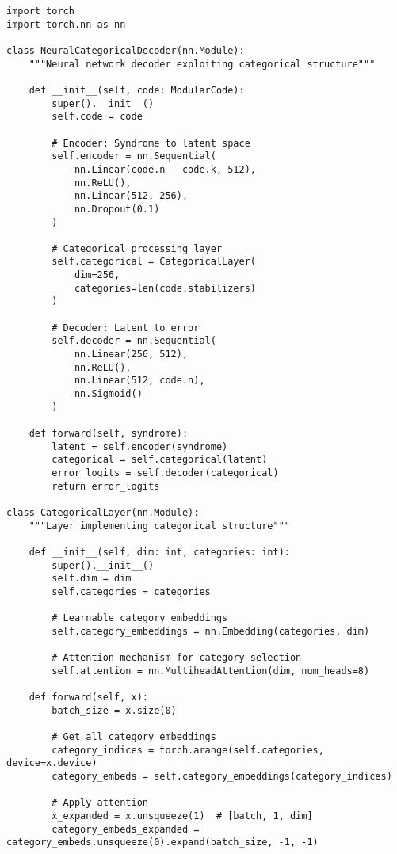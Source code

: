 \documentclass[12pt,a4paper]{article}
\begin{document}
\begin{lstlisting}[style=python,caption=Neural categorical decoder implementation]
import torch
import torch.nn as nn

class NeuralCategoricalDecoder(nn.Module):
    """Neural network decoder exploiting categorical structure"""
    
    def __init__(self, code: ModularCode):
        super().__init__()
        self.code = code
        
        # Encoder: Syndrome to latent space
        self.encoder = nn.Sequential(
            nn.Linear(code.n - code.k, 512),
            nn.ReLU(),
            nn.Linear(512, 256),
            nn.Dropout(0.1)
        )
        
        # Categorical processing layer
        self.categorical = CategoricalLayer(
            dim=256,
            categories=len(code.stabilizers)
        )
        
        # Decoder: Latent to error
        self.decoder = nn.Sequential(
            nn.Linear(256, 512),
            nn.ReLU(),
            nn.Linear(512, code.n),
            nn.Sigmoid()
        )
    
    def forward(self, syndrome):
        latent = self.encoder(syndrome)
        categorical = self.categorical(latent)
        error_logits = self.decoder(categorical)
        return error_logits

class CategoricalLayer(nn.Module):
    """Layer implementing categorical structure"""
    
    def __init__(self, dim: int, categories: int):
        super().__init__()
        self.dim = dim
        self.categories = categories
        
        # Learnable category embeddings
        self.category_embeddings = nn.Embedding(categories, dim)
        
        # Attention mechanism for category selection
        self.attention = nn.MultiheadAttention(dim, num_heads=8)
        
    def forward(self, x):
        batch_size = x.size(0)
        
        # Get all category embeddings
        category_indices = torch.arange(self.categories, device=x.device)
        category_embeds = self.category_embeddings(category_indices)
        
        # Apply attention
        x_expanded = x.unsqueeze(1)  # [batch, 1, dim]
        category_embeds_expanded = category_embeds.unsqueeze(0).expand(batch_size, -1, -1)
        

\end{lstlisting}
\end{document}
